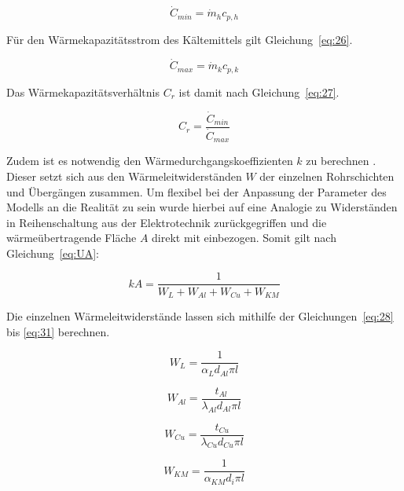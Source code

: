 \begin{equation}
\label{eq:25}
\dot{C}_{min} = \dot{m}_h c_{p,h}
\end{equation} 

Für den Wärmekapazitätsstrom des Kältemittels gilt Gleichung~\ref{eq:26}.

\begin{equation}
\label{eq:26}
\dot{C}_{max} = \dot{m}_k c_{p,k}
\end{equation}
 

Das Wärmekapazitätsverhältnis $C_r$ ist damit nach Gleichung~\ref{eq:27}.
 
\begin{equation}
\label{eq:27}
C_r = \frac{\dot{C}_{min}}{\dot{C}_{max}}
\end{equation}

Zudem ist es notwendig den Wärmedurchgangskoeffizienten $k$ zu berechnen \cite{LehrstuhlfurWarmeundStoffubertragung.}. Dieser setzt sich aus den Wärmeleitwiderständen $W$ der einzelnen Rohrschichten und Übergängen zusammen. Um flexibel bei der Anpassung der Parameter des Modells an die Realität zu sein wurde hierbei auf eine Analogie zu Widerständen in Reihenschaltung aus der Elektrotechnik zurückgegriffen und die wärmeübertragende Fläche $A$ direkt mit einbezogen. Somit gilt nach Gleichung~\ref{eq:UA}:

\begin{equation}
\label{eq:UA}
kA = \frac{1}{W_{L} + W_{Al} + W_{Cu} + W_{KM}}
\end{equation}
 
Die einzelnen Wärmeleitwiderstände lassen sich mithilfe der Gleichungen~\ref{eq:28} bis \ref{eq:31} berechnen.

\begin{equation}
\label{eq:28}
W_L = \frac{1}{\alpha_{L} d_{Al} \pi l}
\end{equation}

\begin{equation}
\label{eq:29}
W_{Al} = \frac{t_{Al}}{\lambda_{Al} d_{Al} \pi l}
\end{equation}

\begin{equation}
\label{eq:30}
W_{Cu} = \frac{t_{Cu}}{\lambda_{Cu} d_{Cu} \pi l}
\end{equation}

\begin{equation}
\label{eq:31}
W_{KM} = \frac{1}{\alpha_{KM} d_{i} \pi l}
\end{equation}

